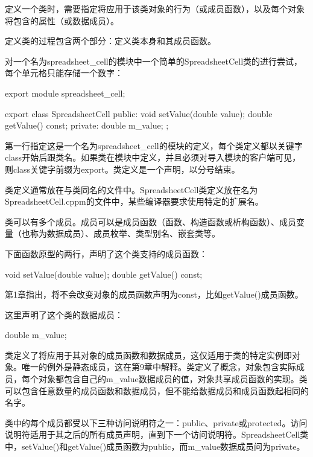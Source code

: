 
定义一个类时，需要指定将应用于该类对象的行为（或成员函数），以及每个对象将包含的属性（或数据成员）。

定义类的过程包含两个部分：定义类本身和其成员函数。


对一个名为spreadsheet\_cell的模块中一个简单的SpreadsheetCell类的进行尝试，每个单元格只能存储一个数字：

\begin{cpp}
export module spreadsheet_cell;

export class SpreadsheetCell
{
    public:
        void setValue(double value);
        double getValue() const;
    private:
        double m_value;
};
\end{cpp}

第一行指定这是一个名为spreadsheet\_cell的模块的定义，每个类定义都以关键字class开始后跟类名。如果类在模块中定义，并且必须对导入模块的客户端可见，则class关键字前缀为export。类定义是一个声明，以分号结束。

类定义通常放在与类同名的文件中。SpreadsheetCell类定义放在名为SpreadsheetCell.cppm的文件中，某些编译器要求使用特定的扩展名。


类可以有多个成员。成员可以是成员函数（函数、构造函数或析构函数）、成员变量（也称为数据成员）、成员枚举、类型别名、嵌套类等。

下面函数原型的两行，声明了这个类支持的成员函数：

\begin{cpp}
void setValue(double value);
double getValue() const;
\end{cpp}

第1章指出，将不会改变对象的成员函数声明为const，比如getValue()成员函数。

这里声明了这个类的数据成员：

\begin{cpp}
double m_value;
\end{cpp}

类定义了将应用于其对象的成员函数和数据成员，这仅适用于类的特定实例即对象。唯一的例外是静态成员，这在第9章中解释。类定义了概念，对象包含实际成员，每个对象都包含自己的m\_value数据成员的值，对象共享成员函数的实现。类可以包含任意数量的成员函数和数据成员，但不能给数据成员和成员函数起相同的名字。


类中的每个成员都受以下三种访问说明符之一：public、private或protected。访问说明符适用于其之后的所有成员声明，直到下一个访问说明符。SpreadsheetCell类中，setValue()和getValue()成员函数为public，而m\_value数据成员问为private。

